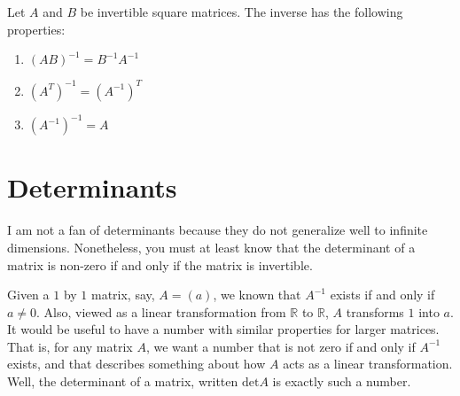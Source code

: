 \documentclass[12pt,reqno]{amsart}
\def\R{\mathbb{R}}
\renewcommand{\det}{\mathrm{det}}
\theoremstyle{definition}
\begin{document}
Let $A$ and $B$ be invertible square matrices. The inverse has the
following properties:
\begin{enumerate}
\item $(AB)^{-1} = B^{-1} A^{-1}$
\item $(A^T)^{-1} = (A^{-1})^T$
\item $(A^{-1})^{-1} = A$
\end{enumerate}

\section{Determinants}

I am not a fan of determinants because they do not generalize well to
infinite dimensions. Nonetheless, you must at least know that the
determinant of a matrix is non-zero if and only if the matrix is
invertible. 

Given a $1$ by $1$ matrix, say, $A = (a)$, we known that $A^{-1}$
exists if and only if $a \neq 0$. Also, viewed as a linear
transformation from $\R$ to $\R$, $A$ transforms $1$ into $a$. It
would be useful to have a number with similar properties for larger
matrices. That is, for any matrix $A$, we want a number that is not
zero if and only if $A^{-1}$ exists, and that describes something
about how $A$ acts as a linear transformation. Well, the determinant
of a matrix, written $\det A$ is exactly such a number. 
\end{document}
